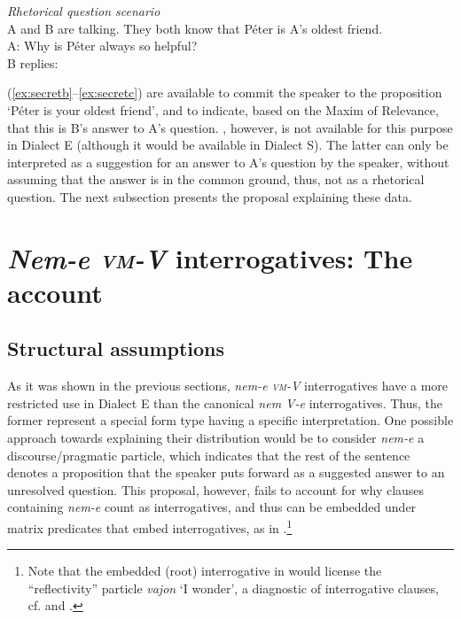 \documentclass[output=paper,colorlinks,citecolor=brown]{langscibook}
\begin{document}
	
	\ea\label{ex:rhet-q} \textit{Rhetorical question scenario}\\
	A and B are talking. They both know that Péter is A's oldest friend.\\
	A: Why is Péter always so helpful?\\
	B replies:
	\label{ex:secreta}
	\label{ex:secretb}
	\label{ex:secretc}
	\z
	\z
	
	\noindent (\ref{ex:secretb}--\ref{ex:secretc}) are available to commit the speaker to the proposition `Péter is your oldest friend', and to indicate, based on the Maxim of Relevance, that this is B's answer to A's question. , however, is not available for this purpose in Dialect E (although it would be available in Dialect S). The latter can only be interpreted as a suggestion for an answer to A's question by the speaker, without assuming that the answer is in the common ground, thus, not as a rhetorical question. The next subsection presents the proposal explaining these data.
	
	
\section{\textit{Nem-e \textsc{vm}-V} interrogatives: The account}\label{sect:account}
	
\subsection{Structural assumptions}\label{sect:structural}
	As it was shown in the previous sections, \textit{nem-e \textsc{vm}-V} interrogatives have a more restricted use in Dialect E than the canonical \textit{nem V-e} interrogatives. Thus, the former represent  a special form type having a specific interpretation. One possible approach towards explaining their distribution would be to consider \textit{nem-e}  a discourse/pragmatic particle, which indicates that the rest of the sentence denotes a proposition that the speaker puts forward as a suggested answer to an unresolved question. This proposal, however, fails to account for why clauses containing \textit{nem-e} count as interrogatives, and thus can be embedded under matrix predicates that embed interrogatives, as in .\footnote{Note that the embedded (root) interrogative in  would license the ``reflectivity'' particle \textit{vajon} `I wonder', a diagnostic of interrogative clauses, cf. \citet{kenesei1994} and \citet{kalman2001}.}
	
\end{document}
